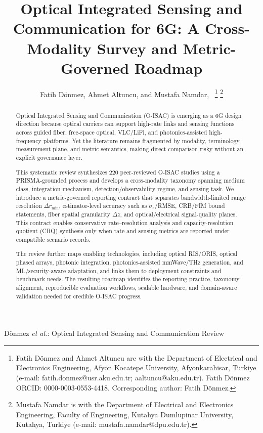 \documentclass[letterpaper,journal]{IEEEtran}
\begin{document}
\title{Optical Integrated Sensing and Communication for 6G: A Cross-Modality Survey and Metric-Governed Roadmap}

\author{Fatih D\"onmez, Ahmet Altuncu, and Mustafa Namdar,~%
    \thanks{Fatih D\"onmez and Ahmet Altuncu are with the Department of Electrical and Electronics Engineering, Afyon Kocatepe University, Afyonkarahisar, Turkiye (e-mail: fatih.donmez@usr.aku.edu.tr; aaltuncu@aku.edu.tr). Fatih D\"onmez ORCID: 0000-0003-0553-4418. Corresponding author: Fatih D\"onmez.}%
    \thanks{Mustafa Namdar is with the Department of Electrical and Electronics Engineering, Faculty of Engineering, Kutahya Dumlupinar University, Kutahya, Turkiye (e-mail: mustafa.namdar@dpu.edu.tr).}}

%
{D\"onmez \MakeLowercase{\textit{et al.}}: Optical Integrated Sensing and Communication Review}

\maketitle

\begin{abstract}
    Optical Integrated Sensing and Communication (O-ISAC) is emerging as a 6G design direction because optical carriers can support high-rate links and sensing functions across guided fiber, free-space optical, VLC/LiFi, and photonics-assisted high-frequency platforms. Yet the literature remains fragmented by modality, terminology, measurement plane, and metric semantics, making direct comparison risky without an explicit governance layer.

    This systematic review synthesizes 220 peer-reviewed O-ISAC studies using a PRISMA-grounded process and develops a cross-modality taxonomy spanning medium class, integration mechanism, detection/observability regime, and sensing task. We introduce a metric-governed reporting contract that separates bandwidth-limited range resolution $\Delta r_{\min}$, estimator-level accuracy such as $\sigma_r$/RMSE, CRB/FIM bound statements, fiber spatial granularity $\Delta z$, and optical/electrical signal-quality planes. This contract enables conservative rate--resolution analysis and capacity-resolution quotient (CRQ) synthesis only when rate and sensing metrics are reported under compatible scenario records.

    The review further maps enabling technologies, including optical RIS/ORIS, optical phased arrays, photonic integration, photonics-assisted mmWave/THz generation, and ML/security-aware adaptation, and links them to deployment constraints and benchmark needs. The resulting roadmap identifies the reporting practice, taxonomy alignment, reproducible evaluation workflows, scalable hardware, and domain-aware validation needed for credible O-ISAC progress.
\end{abstract}
\end{document}
